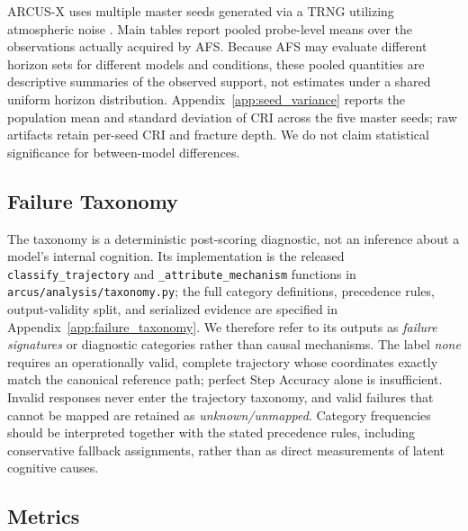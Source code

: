 \documentclass{article}
\begin{document}
ARCUS-X uses multiple master seeds generated via a TRNG utilizing atmospheric noise \cite{haahr_random_org}. Main tables report pooled probe-level means over the observations actually acquired by AFS. Because AFS may evaluate different horizon sets for different models and conditions, these pooled quantities are descriptive summaries of the observed support, not estimates under a shared uniform horizon distribution. Appendix~\ref{app:seed_variance} reports the population mean and standard deviation of CRI across the five master seeds; raw artifacts retain per-seed CRI and fracture depth. We do not claim statistical significance for between-model differences.

\subsection{Failure Taxonomy}
\label{subsec:failure_taxonomy}
The taxonomy is a deterministic post-scoring diagnostic, not an inference about a model's internal cognition. Its implementation is the released \texttt{classify\_trajectory} and \texttt{\_attribute\_mechanism} functions in \texttt{arcus/analysis/taxonomy.py}; the full category definitions, precedence rules, output-validity split, and serialized evidence are specified in Appendix~\ref{app:failure_taxonomy}. We therefore refer to its outputs as \emph{failure signatures} or diagnostic categories rather than causal mechanisms. The label \emph{none} requires an operationally valid, complete trajectory whose coordinates exactly match the canonical reference path; perfect Step Accuracy alone is insufficient. Invalid responses never enter the trajectory taxonomy, and valid failures that cannot be mapped are retained as \emph{unknown/unmapped}. Category frequencies should be interpreted together with the stated precedence rules, including conservative fallback assignments, rather than as direct measurements of latent cognitive causes.

\subsection{Metrics}
\label{subsec:Metrics}
\end{document}
